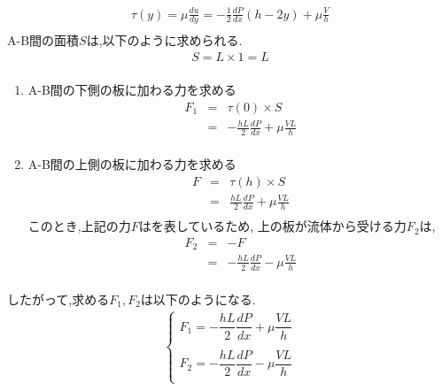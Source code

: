 \documentclass[a4paper]{jsarticle}
\begin{document}
\begin{eqnarray*}
    \tau \left(y\right) = \mu \frac{du}{dy} = -\frac{1}{2}\frac{dP}{dx}\left(h-2y\right)+\mu\frac{V}{h}\\
\end{eqnarray*}
A-B間の面積$S$は,以下のように求められる.
\begin{eqnarray*}
    S=L\times 1 =L\\
\end{eqnarray*}
\begin{enumerate}[(1)]
    \item A-B間の下側の板に加わる力を求める\\
          \begin{eqnarray*}
              F_1&=&\tau\left(0\right)\times S\\
              &=&-\frac{hL}{2}\frac{dP}{dx}+\mu\frac{VL}{h}\\
          \end{eqnarray*}
    \item A-B間の上側の板に加わる力を求める\\
          \begin{eqnarray*}
              F&=&\tau\left(h\right)\times S\\
              &=&\frac{hL}{2}\frac{dP}{dx}+\mu\frac{VL}{h}\\
          \end{eqnarray*}
          このとき,上記の力$F$はを表しているため,
          上の板が流体から受ける力$F_2$は,
          \begin{eqnarray*}
              F_2&=&-F\\
              &=&-\frac{hL}{2}\frac{dP}{dx}-\mu\frac{VL}{h}\\
          \end{eqnarray*}
\end{enumerate}
したがって,求める$F_1,F_2$は以下のようになる.
\begin{eqnarray*}
    \begin{cases}
        F_1=-\dfrac{hL}{2}\dfrac{dP}{dx}+\mu\dfrac{VL}{h} \\
        \\
        F_2=-\dfrac{hL}{2}\dfrac{dP}{dx}-\mu\dfrac{VL}{h} \\
    \end{cases}
\end{eqnarray*}
\end{document}
